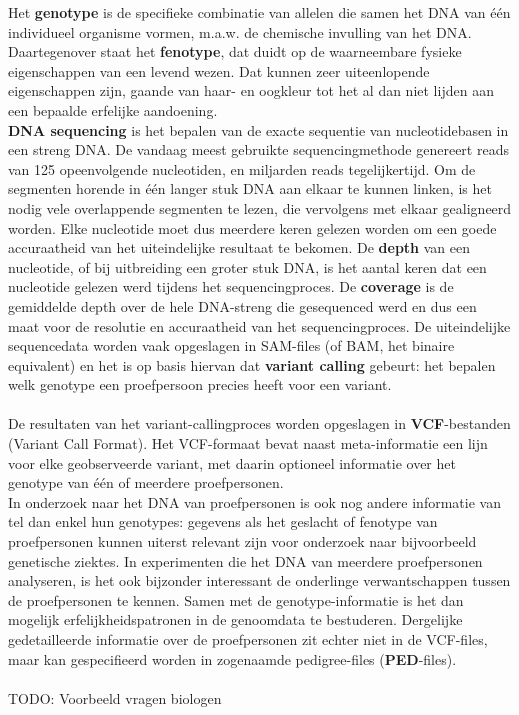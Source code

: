 Het \textbf{genotype} is de specifieke combinatie van allelen die samen het DNA van \'e\'en individueel organisme vormen, m.a.w. de chemische invulling van het DNA. Daartegenover staat het \textbf{fenotype}, dat duidt op de waarneembare fysieke eigenschappen van een levend wezen. Dat kunnen zeer uiteenlopende eigenschappen zijn, gaande van haar- en oogkleur tot het al dan niet lijden aan een bepaalde erfelijke aandoening.\\

\textbf{DNA sequencing} is het bepalen van de exacte sequentie van nucleotidebasen in een streng DNA. De vandaag meest gebruikte sequencingmethode genereert reads van 125 opeenvolgende nucleotiden, en miljarden reads tegelijkertijd. Om de segmenten horende in \'e\'en langer stuk DNA aan elkaar te kunnen linken, is het nodig vele overlappende segmenten te lezen, die vervolgens met elkaar gealigneerd worden. Elke nucleotide moet dus meerdere keren gelezen worden om een goede accuraatheid van het uiteindelijke resultaat te bekomen. De \textbf{depth} van een nucleotide, of bij uitbreiding een groter stuk DNA, is het aantal keren dat een nucleotide gelezen werd tijdens het sequencingproces. De \textbf{coverage} is de gemiddelde depth over de hele DNA-streng die gesequenced werd en dus een maat voor de resolutie en accuraatheid van het sequencingproces. De uiteindelijke sequencedata worden vaak opgeslagen in SAM-files (of BAM, het binaire equivalent) en het is op basis hiervan dat \textbf{variant calling} gebeurt: het bepalen welk genotype een proefpersoon precies heeft voor een variant.\\\\
De resultaten van het variant-callingproces worden opgeslagen in \textbf{VCF}-bestanden (Variant Call Format). Het VCF-formaat bevat naast meta-informatie een lijn voor elke geobserveerde variant, met daarin optioneel informatie over het genotype van \'e\'en of meerdere proefpersonen.\\
In onderzoek naar het DNA van proefpersonen is ook nog andere informatie van tel dan enkel hun genotypes: gegevens als het geslacht of fenotype van proefpersonen kunnen uiterst relevant zijn voor onderzoek naar bijvoorbeeld genetische ziektes. In experimenten die het DNA van meerdere proefpersonen analyseren, is het ook bijzonder interessant de onderlinge verwantschappen tussen de proefpersonen te kennen. Samen met de genotype-informatie is het dan mogelijk erfelijkheidspatronen in de genoomdata te bestuderen. Dergelijke gedetailleerde informatie over de proefpersonen zit echter niet in de VCF-files, maar kan gespecifieerd worden in zogenaamde pedigree-files (\textbf{PED}-files).\\\\

{\color{red}TODO: Voorbeeld vragen biologen}